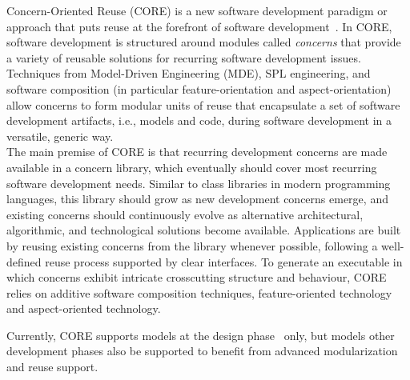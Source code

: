 {Concern-Oriented Reuse (CORE) is a new software development paradigm or approach that puts reuse at the forefront of software development~\cite{alam2013concern}. In CORE, software development is structured around modules called \emph{concerns} that provide a variety of reusable solutions for recurring software development issues. Techniques from Model-Driven Engineering (MDE), SPL engineering, and software composition (in particular feature-orientation and aspect-orientation) allow concerns to form modular units of reuse that encapsulate a set of software development artifacts, i.e., models and code, during software development in a versatile, generic way.\\
The main premise of CORE is that recurring development concerns are made available in a concern library, which eventually should cover most recurring software development needs. Similar to class libraries in modern programming languages, this library should grow as new development concerns emerge, and existing concerns should continuously evolve as alternative architectural, algorithmic, and technological solutions become available. Applications are built by reusing existing concerns from the library whenever possible, following a well-defined reuse process supported by clear interfaces. To generate an executable in which concerns exhibit intricate crosscutting structure and behaviour, CORE relies on additive software composition techniques, feature-oriented technology and aspect-oriented technology.}

Currently, CORE supports models at the design phase~\cite{kienzle2010aspect} only, but  models  other development phases  also be supported   to benefit from advanced modularization and reuse support.

